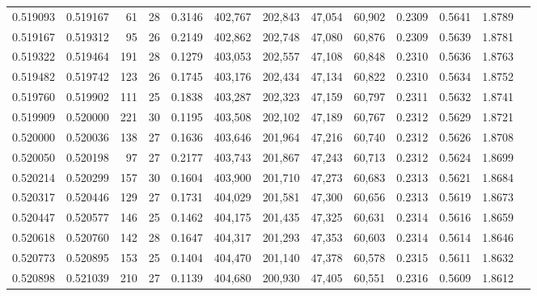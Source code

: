 \begin{tabular}{rrrrrrrrrrrrr}
0.519093 & 0.519167 &     61 &    28 &                                     0.3146 & 402,767 & 202,843 &  47,054 &  60,902 & 0.2309 & 0.5641 & 1.8789 \\
0.519167 & 0.519312 &     95 &    26 &                                     0.2149 & 402,862 & 202,748 &  47,080 &  60,876 & 0.2309 & 0.5639 & 1.8781 \\
0.519322 & 0.519464 &    191 &    28 &                                     0.1279 & 403,053 & 202,557 &  47,108 &  60,848 & 0.2310 & 0.5636 & 1.8763 \\
0.519482 & 0.519742 &    123 &    26 &                                     0.1745 & 403,176 & 202,434 &  47,134 &  60,822 & 0.2310 & 0.5634 & 1.8752 \\
0.519760 & 0.519902 &    111 &    25 &                                     0.1838 & 403,287 & 202,323 &  47,159 &  60,797 & 0.2311 & 0.5632 & 1.8741 \\
0.519909 & 0.520000 &    221 &    30 &                                     0.1195 & 403,508 & 202,102 &  47,189 &  60,767 & 0.2312 & 0.5629 & 1.8721 \\
0.520000 & 0.520036 &    138 &    27 &                                     0.1636 & 403,646 & 201,964 &  47,216 &  60,740 & 0.2312 & 0.5626 & 1.8708 \\
0.520050 & 0.520198 &     97 &    27 &                                     0.2177 & 403,743 & 201,867 &  47,243 &  60,713 & 0.2312 & 0.5624 & 1.8699 \\
0.520214 & 0.520299 &    157 &    30 &                                     0.1604 & 403,900 & 201,710 &  47,273 &  60,683 & 0.2313 & 0.5621 & 1.8684 \\
0.520317 & 0.520446 &    129 &    27 &                                     0.1731 & 404,029 & 201,581 &  47,300 &  60,656 & 0.2313 & 0.5619 & 1.8673 \\
0.520447 & 0.520577 &    146 &    25 &                                     0.1462 & 404,175 & 201,435 &  47,325 &  60,631 & 0.2314 & 0.5616 & 1.8659 \\
0.520618 & 0.520760 &    142 &    28 &                                     0.1647 & 404,317 & 201,293 &  47,353 &  60,603 & 0.2314 & 0.5614 & 1.8646 \\
0.520773 & 0.520895 &    153 &    25 &                                     0.1404 & 404,470 & 201,140 &  47,378 &  60,578 & 0.2315 & 0.5611 & 1.8632 \\
0.520898 & 0.521039 &    210 &    27 &                                     0.1139 & 404,680 & 200,930 &  47,405 &  60,551 & 0.2316 & 0.5609 & 1.8612 \\

\end{tabular}
